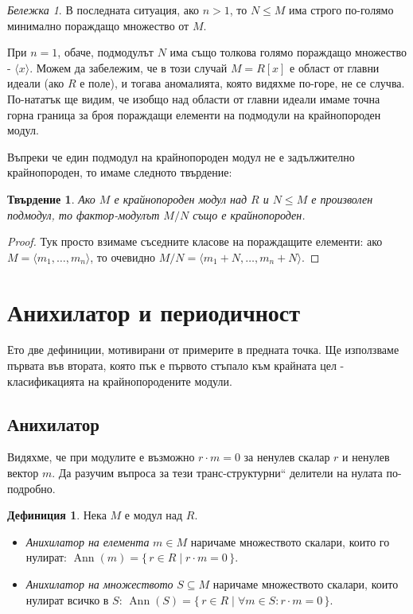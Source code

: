 \documentclass{article}
\newif\ifusemulticols
\theoremstyle{definition}
\newtheorem{deff}{Дефиниция}
\theoremstyle{remark}
\newtheorem*{note}{Бележка}
\theoremstyle{plain}
\theoremstyle{plain}
\newtheorem{prop}[theorem]{Твърдение}
\newenvironment{mymulticols}
    { \ifusemulticols \begin{multicols}{2} \fi }
    { \ifusemulticols \end{multicols} \fi }
\DeclareMathOperator{\Ann}{Ann}
\begin{document}
\begin{mymulticols}
\begin{enumerate}
         \begin{note}
             В последната ситуация, ако $n > 1$, то $N \le M$ има строго по-голямо минимално
             пораждащо множество от $M$.

             При $n = 1$, обаче, подмодулът $N$ има също толкова голямо пораждащо множество -
             $\langle x \rangle$.
             Можем да забележим, че в този случай $M = R[x]$ е област от главни идеали (ако $R$ е
             поле), и тогава аномалията, която видяхме по-горе, не се случва. По-нататък ще видим,
             че изобщо над области от главни идеали имаме точна горна граница за броя пораждащи
             елементи на подмодули на крайнопороден модул.
         \end{note}
\end{enumerate}

Въпреки че един подмодул на крайнопороден модул не е задължително крайнопороден, то имаме следното
твърдение:
\begin{prop}
    Ако $M$ е крайнопороден модул над $R$ и $N \le M$ е произволен подмодул, то фактор-модулът $M /
    N$ също е крайнопороден.
\end{prop}

\begin{proof}
    Тук просто взимаме съседните класове на пораждащите елементи: ако $M = \langle
    m_1,\dots,m_n\rangle$, то очевидно $M/N=\langle m_1+N,\dots,m_n+N\rangle$.
\end{proof}

\section{Анихилатор и периодичност}
Ето две дефиниции, мотивирани от примерите в предната точка. Ще използваме първата във втората,
която пък е първото стъпало към крайната цел - класификацията на крайнопородените модули.

\subsection{Анихилатор}
Видяхме, че при модулите е възможно $r\cdot m = 0$ за ненулев скалар $r$ и ненулев вектор $m$.
Да разучим въпроса за тези \quotedblbase транс-структурни`` делители на нулата по-подробно.

\begin{deff}
    Нека $M$ е модул над $R$.
    \begin{itemize}
        \item \emph{Анихилатор на елемента} $m \in M$ наричаме множеството скалари, които го
            нулират: $\Ann(m) = \{\,r\in R\;|\;r\cdot m=0\,\}$.
        \item \emph{Анихилатор на множеството} $S \subseteq M$ наричаме множеството скалари, които
            нулират всичко в $S$: $\Ann(S)=\{\,r\in R\;|\;\forall m\in S:r\cdot m=0\,\}$.
    \end{itemize}
\end{deff}


\end{mymulticols}
\end{document}
